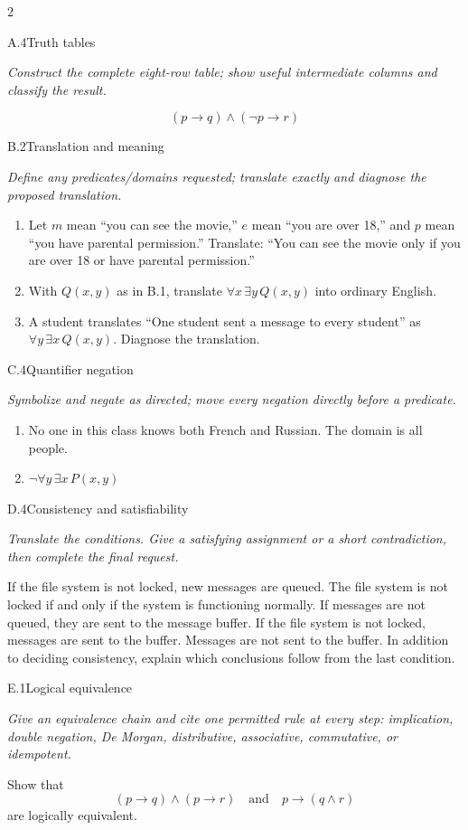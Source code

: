 \documentclass[9pt]{extarticle}
\begin{document}
\begin{multicols}{2}
\begin{CoreProblem}{A.4}{Truth tables}
{\scriptsize\textit{Construct the complete eight-row table; show useful intermediate columns and classify the result.}\par}
\[
  (p\to q)\land(\neg p\to r)
\]
\end{CoreProblem}
\begin{CoreProblem}{B.2}{Translation and meaning}
{\scriptsize\textit{Define any predicates/domains requested; translate exactly and diagnose the proposed translation.}\par}
\begin{enumerate}[label=(\alph*)]
  \item Let $m$ mean ``you can see the movie,'' $e$ mean ``you are over 18,''
        and $p$ mean ``you have parental permission.'' Translate: ``You can
        see the movie only if you are over 18 or have parental permission.''
  \item With $Q(x,y)$ as in B.1, translate $\forall x\,\exists y\,Q(x,y)$
        into ordinary English.
  \item A student translates ``One student sent a message to every student''
        as $\forall y\,\exists x\,Q(x,y)$. Diagnose the translation.
\end{enumerate}
\end{CoreProblem}
\begin{CoreProblem}{C.4}{Quantifier negation}
{\scriptsize\textit{Symbolize and negate as directed; move every negation directly before a predicate.}\par}
\begin{enumerate}[label=(\alph*)]
  \item No one in this class knows both French and Russian. The domain is all
        people.
  \item $\neg\forall y\,\exists x\,P(x,y)$
\end{enumerate}
\end{CoreProblem}
\columnbreak
\begin{CoreProblem}{D.4}{Consistency and satisfiability}
{\scriptsize\textit{Translate the conditions. Give a satisfying assignment or a short contradiction, then complete the final request.}\par}
If the file system is not locked, new messages are queued. The file system is
not locked if and only if the system is functioning normally. If messages are
not queued, they are sent to the message buffer. If the file system is not
locked, messages are sent to the buffer. Messages are not sent to the buffer.
In addition to deciding consistency, explain which conclusions follow from the
last condition.
\end{CoreProblem}
\begin{CoreProblem}{E.1}{Logical equivalence}
{\scriptsize\textit{Give an equivalence chain and cite one permitted rule at every step: implication, double negation, De Morgan, distributive, associative, commutative, or idempotent.}\par}
Show that
\[
  (p\to q)\land(p\to r)
  \quad\text{and}\quad
  p\to(q\land r)
\]
are logically equivalent.
\end{CoreProblem}
\end{multicols}
\end{document}
